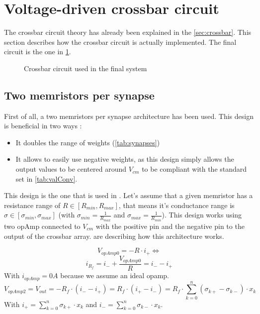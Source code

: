 \section{Voltage-driven crossbar circuit}
\label{sec:xbarCircuit}

The crossbar circuit theory has already been explained in the \cref{sec:crossbar}. This section describes how the crossbar circuit is actually implemented. The final circuit is the one in \cref{circt:xbar}.

\begin{figure}[H]
  \centering
  
  \caption{Crossbar circuit used in the final system}
  \label{circt:xbar}
\end{figure}

\subsection{Two memristors per synapse}

First of all, a two memristors per synapse architecture has been used. This design is beneficial in two ways :

\begin{itemize}
  \item It doubles the range of weights (\cref{tab:synapses})
  \item It allows to easily use negative weights, as this design simply allows the output values to be centered around $V_{cm}$ to be compliant with the standard set in \cref{tab:valConv}.
\end{itemize}

This design is the one that is used in \cite{doubleMem}. Let's assume that a given memristor has a resistance range of $R\in[R_{min},R_{max}]$, that means it's conductance range is $\sigma \in [\sigma_{min},\sigma_{max}]$ (with $\sigma_{min}= \frac{1}{R_{max}}$ and $\sigma_{max}= \frac{1}{R_{min}}$). This design works using two \ac{opAmp} connected to $V_{cm}$ with the positive pin and the negative pin to the output of the crossbar array.  are describing how this architecture works.


\begin{equation}
  \label{eq:doubleMem0}
  V_{opAmp0}=-R\cdot i_+ \Leftrightarrow
\end{equation}
\begin{equation}
  \label{eq:doubleMem1}
  i_{R_f}=i_-+\frac{V_{opAmp0}}{R}=i_--i_+
\end{equation}
With $i_{opAmp}=0A$ because we assume an ideal \ac{opamp}.
\begin{equation}
  \label{eq:doubleMem2}
  V_{opAmp2}=V_{out}=-R_f\cdot(i_--i_+)=R_f\cdot(i_+-i_-)=R_f\cdot\sum_{k=0}^n(\sigma_{k+}-\sigma_{k-})\cdot x_k
\end{equation}
With $i_+=\sum_{k=0}^n\sigma_{k+}\cdot x_k$ and $i_-=\sum_{k=0}^n\sigma_{k-}\cdot x_k$.

